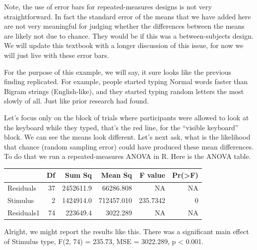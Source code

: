 \documentclass[
  letterpaper,
  DIV=11,
  numbers=noendperiod]{scrreprt}
\begin{document}
\begin{tcolorbox}[enhanced jigsaw, breakable, colback=white, opacitybacktitle=0.6, coltitle=black, toprule=.15mm, bottomtitle=1mm, leftrule=.75mm, arc=.35mm, title=\textcolor{quarto-callout-note-color}{\faInfo}\hspace{0.5em}{Note}, opacityback=0, colframe=quarto-callout-note-color-frame, left=2mm, titlerule=0mm, toptitle=1mm, colbacktitle=quarto-callout-note-color!10!white, rightrule=.15mm, bottomrule=.15mm]

Note, the use of error bars for repeated-measures designs is not very
straightforward. In fact the standard error of the means that we have
added here are not very meaningful for judging whether the differences
between the means are likely not due to chance. They would be if this
was a between-subjects design. We will update this textbook with a
longer discussion of this issue, for now we will just live with these
error bars.

\end{tcolorbox}

For the purpose of this example, we will say, it sure looks like the
previous finding replicated. For example, people started typing Normal
words faster than Bigram strings (English-like), and they started typing
random letters the most slowly of all. Just like prior research had
found.

Let's focus only on the block of trials where participants were allowed
to look at the keyboard while they typed, that's the red line, for the
``visible keyboard'' block. We can see the means look different. Let's
next ask, what is the likelihood that chance (random sampling error)
could have produced these mean differences. To do that we run a
repeated-measures ANOVA in R. Here is the ANOVA table.

\begin{longtable}[]{@{}lrrrrr@{}}
\toprule\noalign{}
& Df & Sum Sq & Mean Sq & F value & Pr(\textgreater F) \\
\midrule\noalign{}
\endhead
\bottomrule\noalign{}
\endlastfoot
Residuals & 37 & 2452611.9 & 66286.808 & NA & NA \\
Stimulus & 2 & 1424914.0 & 712457.010 & 235.7342 & 0 \\
Residuals1 & 74 & 223649.4 & 3022.289 & NA & NA \\
\end{longtable}

Alright, we might report the results like this. There was a significant
main effect of Stimulus type, F(2, 74) = 235.73, MSE = 3022.289, p
\textless{} 0.001.
\end{document}

